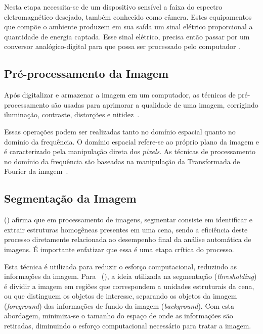 Nesta etapa necessita-se de um dispositivo sensível a faixa do espectro eletromagnético desejado, também conhecido como câmera. Estes equipamentos que compõe o ambiente produzem em sua saída um sinal elétrico proporcional a quantidade de energia captada. Esse sinal elétrico, precisa então passar por um conversor analógico-digital para que possa ser processado pelo computador \cite{rogeralex1999}.

\subsection{Pré-processamento da Imagem}
\label{subsec:preProcImagem}

Após digitalizar e armazenar a imagem em um computador, as técnicas de pré-processamento são usadas para aprimorar a qualidade de uma imagem, corrigindo iluminação, contraste, distorções e nitidez~\cite{rudek2001visao}.

Essas operações podem ser realizadas tanto no domínio espacial quanto no domínio da frequência. O domínio espacial refere-se ao próprio plano da imagem e é caracterizado pela manipulação direta dos \textit{pixels}. As técnicas de processamento no domínio da frequência são baseadas na manipulação da Transformada de Fourier da imagem~\cite{rogeralex1999}.

\subsection{Segmentação da Imagem}
\label{subsec:segImagem}

\citeauthor{heinen2004navegaccao} (\citeyear{heinen2004navegaccao}) afirma que em processamento de imagens, segmentar consiste em identificar e extrair estruturas homogêneas presentes em uma cena, sendo a eficiência deste processo diretamente relacionada ao desempenho final da análise automática de imagens. É importante enfatizar que essa é uma etapa crítica do processo.

Esta técnica é utilizada para reduzir o esforço computacional, reduzindo as informações da imagem. Para~\citeauthor{rudek2001visao} (\citeyear{rudek2001visao}), a ideia utilizada na segmentação (\textit{thresholding}) é dividir a imagem em regiões que correspondem a unidades estruturais da cena, ou que distinguem os objetos de interesse, separando os objetos da imagem (\textit{foreground}) das informações de fundo da imagem (\textit{background}). Com esta abordagem, minimiza-se o tamanho do espaço de onde as informações são retiradas, diminuindo o esforço computacional necessário para tratar a imagem.

